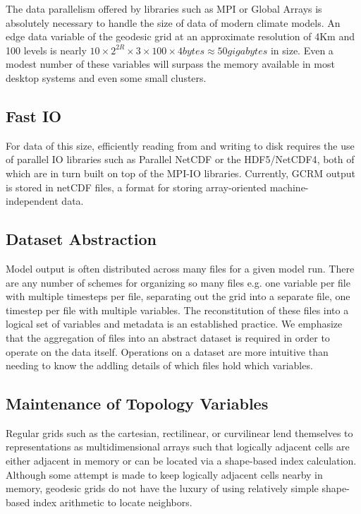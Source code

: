 The data parallelism offered by libraries such as MPI or Global Arrays is
absolutely necessary to handle the size of data of modern climate models.  An
edge data variable of the geodesic grid at an approximate resolution of 4Km
and 100 levels is nearly $10 \times 2^{2R} \times 3 \times 100 \times 4
\unit{bytes} \approx 50 \unit{gigabytes}$ in size.  Even a modest number of
these variables will surpass the memory available in most desktop systems and
even some small clusters.

\subsection{Fast IO}

For data of this size, efficiently reading from and writing to disk requires
the use of parallel IO libraries such as Parallel NetCDF\cite{PNETCDF} or the
HDF5/NetCDF4\cite{HDF5}\cite{NETCDF}, both of which are in turn built on top
of the MPI-IO libraries\cite{MPIIO}.  Currently, GCRM output is stored in
netCDF\cite{NETCDF} files, a format for storing array-oriented
machine-independent data.

\subsection{Dataset Abstraction}

Model output is often distributed across many files for a given model run.
There are any number of schemes for organizing so many files e.g. one variable
per file with multiple timesteps per file, separating out the grid into a
separate file, one timestep per file with multiple variables.  The
reconstitution of these files into a logical set of variables and metadata is
an established practice\cite{NcML,THREDDS}.  We emphasize that the aggregation
of files into an abstract dataset is required in order to operate on the data
itself.  Operations on a dataset are more intuitive than needing to know the
addling details of which files hold which variables.

\subsection{Maintenance of Topology Variables}

Regular grids such as the cartesian, rectilinear, or curvilinear lend
themselves to representations as multidimensional arrays such that logically
adjacent cells are either adjacent in memory or can be located via a
shape-based index calculation.  Although some attempt is made to keep
logically adjacent cells nearby in memory, geodesic grids do not have the
luxury of using relatively simple shape-based index arithmetic to locate
neighbors.


